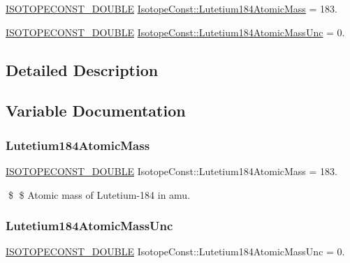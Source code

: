 \begin{DoxyCompactItemize}
\item 
\mbox{\hyperlink{group___isotope_const-_macros_ga8f45a7272ce02c0b4c65c44636ed719a}{I\+S\+O\+T\+O\+P\+E\+C\+O\+N\+S\+T\+\_\+\+D\+O\+U\+B\+LE}} \mbox{\hyperlink{group___isotope_const-_lutetium-_lu184_ga5aa1d48a1843dedd101273eec548d83e}{Isotope\+Const\+::\+Lutetium184\+Atomic\+Mass}} = 183.
\item 
\mbox{\hyperlink{group___isotope_const-_macros_ga8f45a7272ce02c0b4c65c44636ed719a}{I\+S\+O\+T\+O\+P\+E\+C\+O\+N\+S\+T\+\_\+\+D\+O\+U\+B\+LE}} \mbox{\hyperlink{group___isotope_const-_lutetium-_lu184_ga32e800022a6b9926e16f892f57934a34}{Isotope\+Const\+::\+Lutetium184\+Atomic\+Mass\+Unc}} = 0.
\end{DoxyCompactItemize}


\subsection{Detailed Description}


\subsection{Variable Documentation}
\mbox{\label{group___isotope_const-_lutetium-_lu184_ga5aa1d48a1843dedd101273eec548d83e}} 
\subsubsection{\texorpdfstring{Lutetium184\+Atomic\+Mass}{Lutetium184AtomicMass}}
{\footnotesize\ttfamily \mbox{\hyperlink{group___isotope_const-_macros_ga8f45a7272ce02c0b4c65c44636ed719a}{I\+S\+O\+T\+O\+P\+E\+C\+O\+N\+S\+T\+\_\+\+D\+O\+U\+B\+LE}} Isotope\+Const\+::\+Lutetium184\+Atomic\+Mass = 183.}

\$ \$ Atomic mass of Lutetium-\/184 in amu. \mbox{\label{group___isotope_const-_lutetium-_lu184_ga32e800022a6b9926e16f892f57934a34}} 
\subsubsection{\texorpdfstring{Lutetium184\+Atomic\+Mass\+Unc}{Lutetium184AtomicMassUnc}}
{\footnotesize\ttfamily \mbox{\hyperlink{group___isotope_const-_macros_ga8f45a7272ce02c0b4c65c44636ed719a}{I\+S\+O\+T\+O\+P\+E\+C\+O\+N\+S\+T\+\_\+\+D\+O\+U\+B\+LE}} Isotope\+Const\+::\+Lutetium184\+Atomic\+Mass\+Unc = 0.}

